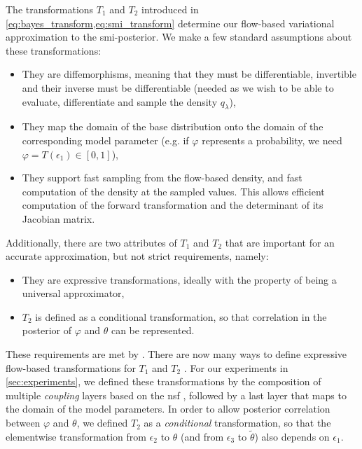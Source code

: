 The transformations $T_1$ and $T_2$ introduced in \cref{eq:bayes_transform,eq:smi_transform} determine our flow-based variational approximation to the \acrshort*{smi}-posterior. We make a few standard assumptions about these transformations:
\begin{itemize}
  \item They are diffemorphisms, meaning that they must be differentiable, invertible and their inverse must be differentiable (needed as we wish to be able to evaluate, differentiate and sample the density $q_\lambda$),
  \item They map the domain of the base distribution onto the domain of the corresponding model parameter (e.g. if $\varphi$ represents a probability, we need $\varphi=T(\epsilon_1)\in[0,1]$),
  \item They support fast sampling from the flow-based density, and fast computation of the density at the sampled values. This allows efficient computation of the forward transformation and the determinant of its Jacobian matrix.
\end{itemize}
Additionally, there are two attributes of $T_1$ and $T_2$ that are important for an accurate approximation, but not strict requirements, namely:
\begin{itemize}
  \item They are expressive transformations, ideally  with the property of being a universal approximator,
  \item $T_2$ is defined as a conditional transformation, so that correlation in the posterior of $\varphi$ and $\theta$ can be represented.
\end{itemize}

These requirements are met by . There are now many ways to define expressive flow-based transformations for $T_1$ and $T_2$ \citep[see][for reviews]{Kobyzev2020normalizing,Papamakarios2021normalizing}.
For our experiments in \cref{sec:experiments}, we defined these transformations by the composition of multiple \emph{coupling} layers
based on the \acrfull*{nsf} \citep{Durkan2019neural}, followed by a last layer that maps to the domain of the model parameters.
In order to allow posterior correlation between $\varphi$ and $\theta$, we defined $T_2$ as a \emph{conditional} transformation, so that the elementwise transformation from $\epsilon_2$ to $\theta$ (and from $\epsilon_3$ to $\tilde\theta$) also depends on $\epsilon_1$.



